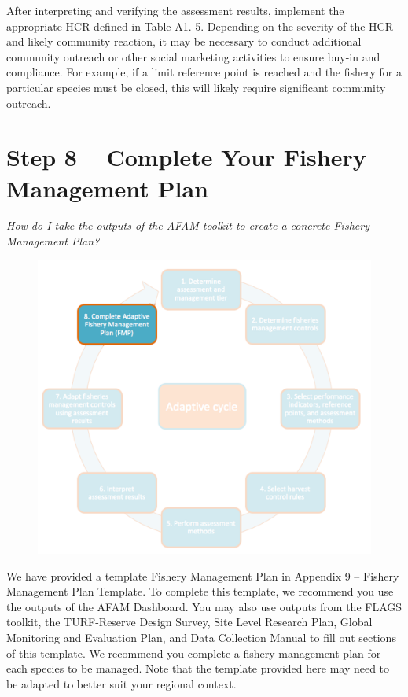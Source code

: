 \documentclass[]{book}
\begin{document}
After interpreting and verifying the assessment results, implement the
appropriate HCR defined in Table A1. 5. Depending on the severity of the
HCR and likely community reaction, it may be necessary to conduct
additional community outreach or other social marketing activities to
ensure buy-in and compliance. For example, if a limit reference point is
reached and the fishery for a particular species must be closed, this
will likely require significant community outreach.

\chapter{Step 8 -- Complete Your Fishery Management Plan}\label{Step8}

\emph{How do I take the outputs of the AFAM toolkit to create a concrete
Fishery Management Plan?}

\begin{figure}
\centering
\includegraphics{myMediaFolder/media/Step8.png}
\caption{}
\end{figure}

We have provided a template Fishery Management Plan in Appendix 9 --
Fishery Management Plan Template. To complete this template, we
recommend you use the outputs of the AFAM Dashboard. You may also use
outputs from the FLAGS toolkit, the TURF-Reserve Design Survey, Site
Level Research Plan, Global Monitoring and Evaluation Plan, and Data
Collection Manual to fill out sections of this template. We recommend
you complete a fishery management plan for each species to be managed.
Note that the template provided here may need to be adapted to better
suit your regional context.
\end{document}
